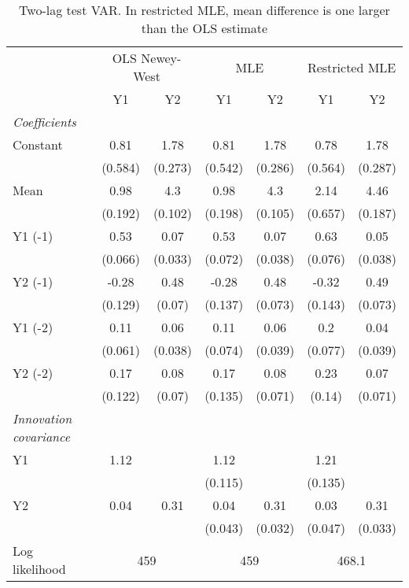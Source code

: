 \begin{table}[htbp] 
	\centering 
	\begin{tabular}{@{\extracolsep{4pt}}lcccccc@{}}		\hline\hline
		 		 & \multicolumn{2}{c}{OLS Newey-West} &\multicolumn{2}{c}{MLE} &\multicolumn{2}{c}{Restricted MLE} \\ 
 		 & Y1 	 & Y2 	 & Y1 	 & Y2 	 & Y1 	 & Y2\\\cline{2-3}\cline{4-5}\cline{6-7}
\rule{0pt}{4ex} 
 \emph{Coefficients} 	  		 & 		 & 		 & 		 & 		 & 		 &\\ 
\quad Constant 	 & 0.81 	 & 1.78 	 & 0.81 	 & 1.78 	 & 0.78 	 & 1.78	 \\ 
 		 & (0.584) 	 & (0.273) 	 & (0.542) 	 & (0.286) 	 & (0.564) 	 & (0.287) 	 \\ 
\quad Mean 	 & 0.98 	 & 4.3 	 & 0.98 	 & 4.3 	 & 2.14 	 & 4.46	 \\ 
 		 & (0.192) 	 & (0.102) 	 & (0.198) 	 & (0.105) 	 & (0.657) 	 & (0.187) 	 \\ 
\quad Y1 (-1) 	 &0.53 	 & 0.07 	 & 0.53 	 & 0.07 	 & 0.63 	 & 0.05	 \\ 
 		 & (0.066) 	 & (0.033) 	 & (0.072) 	 & (0.038) 	 & (0.076) 	 & (0.038) 	 \\ 
\quad Y2 (-1) 	 &-0.28 	 & 0.48 	 & -0.28 	 & 0.48 	 & -0.32 	 & 0.49	 \\ 
 		 & (0.129) 	 & (0.07) 	 & (0.137) 	 & (0.073) 	 & (0.143) 	 & (0.073) 	 \\ 
\quad Y1 (-2) 	 &0.11 	 & 0.06 	 & 0.11 	 & 0.06 	 & 0.2 	 & 0.04	 \\ 
 		 & (0.061) 	 & (0.038) 	 & (0.074) 	 & (0.039) 	 & (0.077) 	 & (0.039) 	 \\ 
\quad Y2 (-2) 	 &0.17 	 & 0.08 	 & 0.17 	 & 0.08 	 & 0.23 	 & 0.07	 \\ 
 		 & (0.122) 	 & (0.07) 	 & (0.135) 	 & (0.071) 	 & (0.14) 	 & (0.071) 	 \\ 
\rule{0pt}{4ex} \emph{Innovation covariance}  	 & 	 & 	 & 	 & 	 & 	 &\\ 
\quad Y1 	 &1.12 	 &  	 & 1.12 	 &  	 & 1.21 	 & 	 \\ 
 		 &  	 &  	 & (0.115) 	 &  	 & (0.135) 	 &  	 \\ 
\quad Y2 	 &0.04 	 & 0.31 	 & 0.04 	 & 0.31 	 & 0.03 	 & 0.31	 \\ 
 		 &  	 &  	 & (0.043) 	 & (0.032) 	 & (0.047) 	 & (0.033) 	 \\ 
 \hline \rule{0pt}{4ex} 
  Log likelihood 	 &\multicolumn{2}{c}{459} 	 & \multicolumn{2}{c}{459} 	 & \multicolumn{2}{c}{468.1}\\ 

 \hline 	\end{tabular}		\caption{Two-lag test VAR. In restricted MLE, mean difference is one
           larger than the OLS estimate}
		\label{tab:twolag}

\end{table}